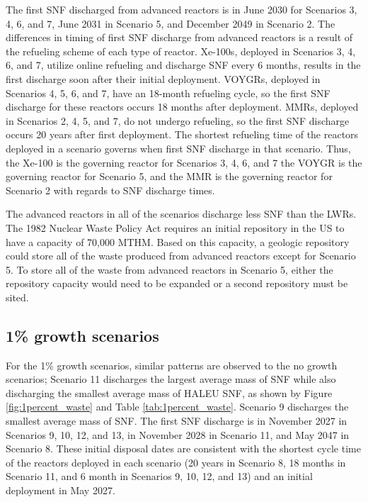 The first \gls{SNF} discharged from advanced reactors is in June 
2030 for Scenarios 3, 4, 6, and 7, June 2031 
in Scenario 5, and 
December 2049 in Scenario 2. The differences in timing of first \gls{SNF} 
discharge from advanced reactors is a result of the refueling scheme of 
each type of reactor. Xe-100s, deployed in Scenarios 3, 4, 6, 
and 7, utilize online refueling and discharge \gls{SNF} 
every 6 months, results in the first discharge soon after their initial 
deployment. VOYGRs, deployed in Scenarios 4, 5, 6, and 7, have an 
18-month refueling cycle, so the first \gls{SNF} discharge for these 
reactors occurs 18 months after deployment. \glspl{MMR}, deployed in 
Scenarios 2, 4, 5, and 7, do not undergo refueling, so the first \gls{SNF} 
discharge occurs 20 years after first deployment. The shortest refueling 
time of the reactors deployed in a scenario governs when 
first \gls{SNF} discharge in that scenario. Thus, the Xe-100 is the 
governing reactor for 
Scenarios 3, 4, 6, and 7 the VOYGR is the governing reactor for Scenario  
5, and the \gls{MMR} is the governing reactor for Scenario 2 with regards 
to \gls{SNF} discharge times. 

The 
advanced reactors in all of the scenarios discharge 
less \gls{SNF} than the \glspl{LWR}. The 1982 Nuclear Waste Policy Act
\cite{noauthor_nuclear_1983} requires an initial 
repository in the US to have a capacity of 70,000 MTHM. Based on this 
capacity,  a geologic repository could store 
all of the waste produced from advanced reactors except for Scenario 5. 
To store all of the waste from advanced reactors in Scenario 5, either 
the repository capacity would need to be expanded or a second repository 
must be sited.

\subsection{1\% growth scenarios}
For the 1\% growth scenarios, similar patterns are observed to the 
no growth scenarios; Scenario 11 discharges  
the largest average mass of \gls{SNF} while also discharging
the smallest average mass of \gls{HALEU} \gls{SNF}, as shown by  
Figure \ref{fig:1percent_waste} and Table \ref{tab:1percent_waste}. 
Scenario 9 discharges the smallest average mass of \gls{SNF}. The 
first \gls{SNF} discharge 
is in November 2027 in Scenarios 9, 10, 12, and 13, in 
November 2028 in Scenario 11, and May 2047 in Scenario 8. These initial 
disposal dates are consistent with the shortest cycle time of the 
reactors deployed in each scenario (20 years in Scenario 8, 18 months in 
Scenario 11, and 6 month in Scenarios 9, 10, 12, and 13) and an 
initial deployment in May 2027. 

